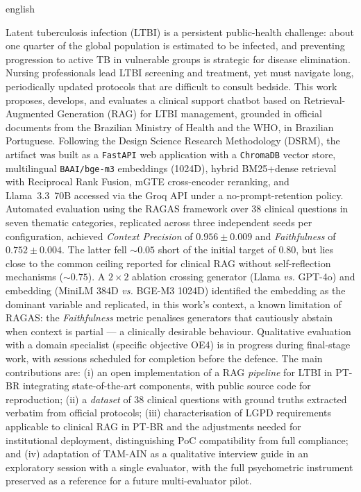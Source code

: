 \documentclass[
  12pt,
  oneside,
  a4paper,
  english,
  brazil
]{abntex2}
\begin{document}
\begin{resumo}[Abstract]
\begin{otherlanguage*}{english}

Latent tuberculosis infection (LTBI) is a persistent public-health
challenge: about one quarter of the global population is estimated to be
infected, and preventing progression to active TB in vulnerable groups
is strategic for disease elimination. Nursing professionals lead LTBI
screening and treatment, yet must navigate long, periodically updated
protocols that are difficult to consult bedside. This work proposes,
develops, and evaluates a clinical support chatbot based on
Retrieval-Augmented Generation (RAG) for LTBI management, grounded in
official documents from the Brazilian Ministry of Health and the WHO,
in Brazilian Portuguese. Following the Design Science Research
Methodology (DSRM), the artifact was built as a \texttt{FastAPI} web
application with a \texttt{ChromaDB} vector store, multilingual
\texttt{BAAI/bge-m3} embeddings (1024D), hybrid BM25+dense retrieval
with Reciprocal Rank Fusion, mGTE cross-encoder reranking, and
Llama~3.3~70B accessed via the Groq API under a no-prompt-retention
policy. Automated evaluation using the RAGAS framework over 38 clinical
questions in seven thematic categories, replicated across three
independent seeds per configuration, achieved \textit{Context Precision}
of $0.956 \pm 0.009$ and \textit{Faithfulness} of $0.752 \pm 0.004$. The
latter fell $\sim 0.05$ short of the initial target of $0.80$, but lies
close to the common ceiling reported for clinical RAG without
self-reflection mechanisms ($\sim 0.75$). A $2 \times 2$ ablation
crossing generator (Llama \textit{vs.} GPT-4o) and embedding (MiniLM
384D \textit{vs.} BGE-M3 1024D) identified the embedding as the dominant
variable and replicated, in this work's context, a known limitation of
RAGAS: the \textit{Faithfulness} metric penalises generators that
cautiously abstain when context is partial --- a clinically desirable
behaviour. Qualitative evaluation with a domain specialist (specific
objective OE4) is in progress during final-stage work, with sessions
scheduled for completion before the defence. The main contributions are:
(i) an open implementation of a RAG \textit{pipeline} for LTBI in PT-BR
integrating state-of-the-art components, with public source code for
reproduction; (ii) a \textit{dataset} of 38 clinical questions with
ground truths extracted verbatim from official protocols; (iii)
characterisation of LGPD requirements applicable to clinical RAG in
PT-BR and the adjustments needed for institutional deployment,
distinguishing PoC compatibility from full compliance; and (iv)
adaptation of TAM-AIN as a qualitative interview guide in an exploratory
session with a single evaluator, with the full psychometric instrument
preserved as a reference for a future multi-evaluator pilot.


\end{otherlanguage*}
\end{resumo}
\end{document}
